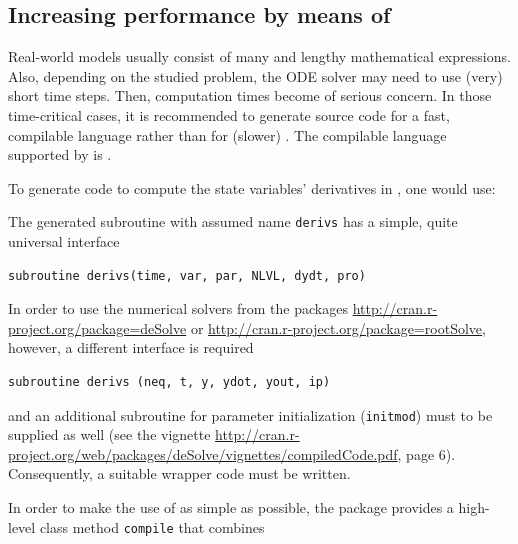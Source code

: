 \documentclass[onecolumn]{article}
\begin{document}
\subsection{Increasing performance by means of } \label{sec:advanced:fortran}

Real-world models usually consist of many and lengthy mathematical expressions. Also, depending on the studied problem, the ODE solver may need to use (very) short time steps. Then, computation times become of serious concern. In those time-critical cases, it is recommended to generate source code for a fast, compilable language rather than for (slower) . The compilable language supported by  is .

To generate code to compute the state variables' derivatives in , one would use:

\begin{Schunk}
\end{Schunk}

The generated  subroutine with assumed name \verb|derivs| has a simple, quite universal interface

\begin{verbatim}
subroutine derivs(time, var, par, NLVL, dydt, pro)
\end{verbatim}

In order to use the numerical solvers from the packages \url{http://cran.r-project.org/package=deSolve} or \url{http://cran.r-project.org/package=rootSolve}, however, a different interface is required

\begin{verbatim}
subroutine derivs (neq, t, y, ydot, yout, ip)
\end{verbatim}

and an additional subroutine for parameter initialization (\verb|initmod|) must to be supplied as well (see the  vignette \url{http://cran.r-project.org/web/packages/deSolve/vignettes/compiledCode.pdf}, page 6). Consequently, a suitable wrapper code must be written.

In order to make the use of  as simple as possible, the  package provides a high-level class method \verb|compile| that combines
\end{document}
